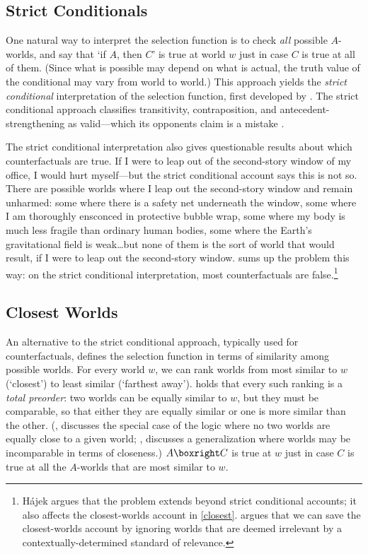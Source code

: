 \subsection{Strict Conditionals}
\label{strict}

One natural way to interpret the selection function is to check \emph{all} possible $A$-worlds, and say that `if $A$, then $C$' is true at world $w$ just in case $C$ is true at all of them.  (Since what is possible may depend on what is actual, the truth value of the conditional may vary from world to world.)  This approach yields the \emph{strict conditional} interpretation of the selection function, first developed by \citet{lewis-survey}.  The strict conditional approach classifies transitivity, contraposition, and antecedent-strengthening as valid---which its opponents claim is a mistake \citep[see][4--12]{lewis-counterfactuals}.

The strict conditional interpretation also gives questionable results about which counterfactuals are true.  If I were to leap out of the second-story window of my office, I would hurt myself---but the strict conditional account says this is not so.  There are possible worlds where I leap out the second-story window and remain unharmed: some where there is a safety net underneath the window, some where I am thoroughly ensconced in protective bubble wrap, some where my body is much less fragile than ordinary human bodies, some where the Earth's gravitational field is weak\ldots but none of them is the sort of world that would result, if I were to leap out the second-story window.  \citet{HajekManuscript-HJEMCA} sums up the problem this way: on the strict conditional interpretation, most counterfactuals are false.\footnote{H\'{a}jek argues that the problem extends beyond strict conditional accounts; it also affects the closest-worlds account in \autoref{closest}.  \citet{Lewis2015-LEWEC} argues that we can save the closest-worlds account by ignoring worlds that are deemed irrelevant by a contextually-determined standard of relevance.}

\subsection{Closest Worlds}
\label{closest}

An alternative to the strict conditional approach, typically used for counterfactuals, defines the selection function in terms of similarity among possible worlds.  For every world $w$, we can rank worlds from most similar to $w$ (`closest') to least similar (`farthest away').  \citet{lewis-counterfactuals} holds that every such ranking is a \emph{total preorder}: two worlds can be equally similar to $w$, but they must be comparable, so that either they are equally similar or one is more similar than the other.  (\citealp{stalnaker:conditionals}, discusses the special case of the logic where no two worlds are equally close to a given world; \citealp{Pollock1976-POLTPW}, discusses a generalization where worlds may be incomparable in terms of closeness.)  $A \boxright C$ is true at $w$ just in case $C$ is true at all the $A$-worlds that are most similar to $w$.

